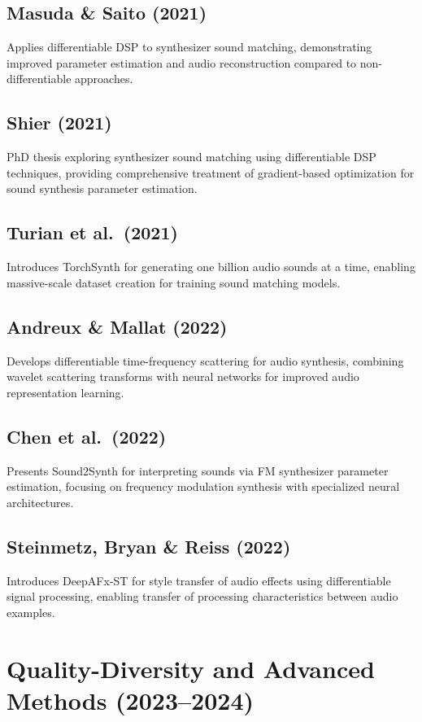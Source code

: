 \documentclass[12pt]{article}
\begin{document}
\subsection*{Masuda \& Saito (2021) \cite{MasudaSaito2021}}
Applies differentiable DSP to synthesizer sound matching, demonstrating improved parameter estimation and audio reconstruction compared to non-differentiable approaches.

\subsection*{Shier (2021) \cite{Shier2021}}
PhD thesis exploring synthesizer sound matching using differentiable DSP techniques, providing comprehensive treatment of gradient-based optimization for sound synthesis parameter estimation.

\subsection*{Turian et al.\ (2021) \cite{Turian2021}}
Introduces TorchSynth for generating one billion audio sounds at a time, enabling massive-scale dataset creation for training sound matching models.

\subsection*{Andreux \& Mallat (2022) \cite{Andreux2022}}
Develops differentiable time-frequency scattering for audio synthesis, combining wavelet scattering transforms with neural networks for improved audio representation learning.

\subsection*{Chen et al.\ (2022) \cite{Chen2022}}
Presents Sound2Synth for interpreting sounds via FM synthesizer parameter estimation, focusing on frequency modulation synthesis with specialized neural architectures.

\subsection*{Steinmetz, Bryan \& Reiss (2022) \cite{Steinmetz2022}}
Introduces DeepAFx-ST for style transfer of audio effects using differentiable signal processing, enabling transfer of processing characteristics between audio examples.

\section{Quality-Diversity and Advanced Methods (2023--2024)}
\end{document}
